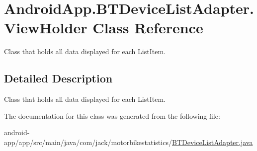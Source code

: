 \hypertarget{class_android_app_1_1_b_t_device_list_adapter_1_1_view_holder}{}\section{Android\+App.\+B\+T\+Device\+List\+Adapter.\+View\+Holder Class Reference}
\label{class_android_app_1_1_b_t_device_list_adapter_1_1_view_holder}


Class that holds all data displayed for each List\+Item.  




\subsection{Detailed Description}
Class that holds all data displayed for each List\+Item. 

The documentation for this class was generated from the following file\+:\begin{DoxyCompactItemize}
\item 
android-\/app/app/src/main/java/com/jack/motorbikestatistics/\hyperlink{_b_t_device_list_adapter_8java}{B\+T\+Device\+List\+Adapter.\+java}\end{DoxyCompactItemize}
